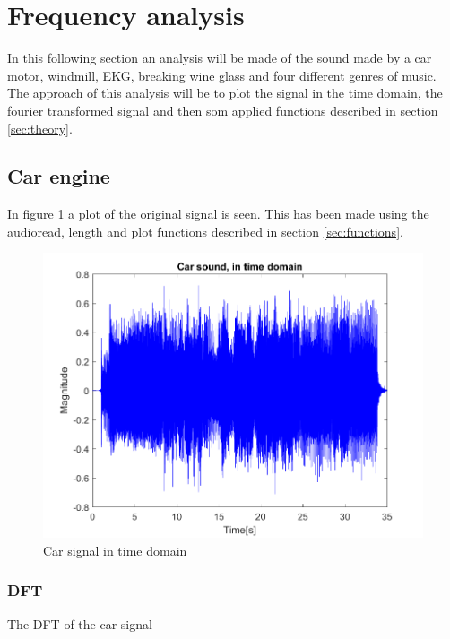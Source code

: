 \section{Frequency analysis}
\label{sec:analysis}

In this following section an analysis will be made of the sound made by a car motor, windmill, EKG, breaking wine glass and four different genres of music. 
The approach of this analysis will be to plot the signal in the time domain, the fourier transformed signal and then som applied functions described in section \ref{sec:theory}.


\subsection{Car engine}

In figure \ref{fig:Car_time} a plot of the original signal is seen. This has been made using the audioread, length and plot functions described in section \ref{sec:functions}. 

\begin{figure}
	\includegraphics[width=\textwidth]{code/Car_figure1.png}
	\caption{Car signal in time domain}
	\label{fig:Car_time}
\end{figure}

\subsubsection{DFT}
The DFT of the car signal 

